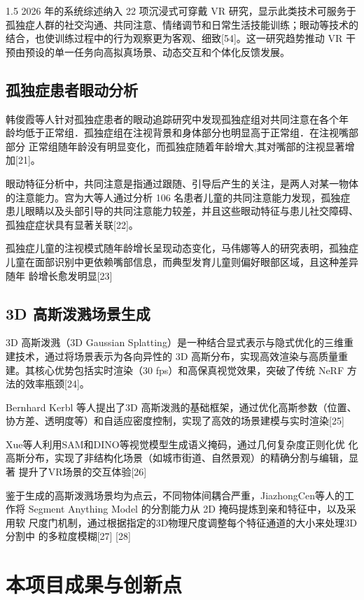 \documentclass[zihao=-4]{ctexart}
\begin{document}
\begin{spacing}{1.5}
2026 年的系统综述纳入 22 项沉浸式可穿戴 VR 研究，显示此类技术可服务于孤独症人群的社交沟通、共同注意、情绪调节和日常生活技能训练；眼动等技术的结合，也使训练过程中的行为观察更为客观、细致[54]。这一研究趋势推动 VR 干预由预设的单一任务向高拟真场景、动态交互和个体化反馈发展。

\subsection{孤独症患者眼动分析}

韩俊霞等人针对孤独症患者的眼动追踪研究中发现孤独症组对共同注意在各个年 龄均低于正常组．孤独症组在注视背景和身体部分也明显高于正常组．在注视嘴部部分 正常组随年龄没有明显变化，而孤独症随着年龄增大,其对嘴部的注视显著增加[21]。

眼动特征分析中，共同注意是指通过跟随、引导后产生的关注，是两人对某一物体的注意能力。宫为大等人通过分析 106 名患者儿童的共同注意能力发现，孤独症患儿眼睛以及头部引导的共同注意能力较差，并且这些眼动特征与患儿社交障碍、孤独症症状具有显著关联[22]。

孤独症儿童的注视模式随年龄增长呈现动态变化，马伟娜等人的研究表明，孤独症 儿童在面部识别中更依赖嘴部信息，而典型发育儿童则偏好眼部区域，且这种差异随年 龄增长愈发明显[23]

\subsection{3D 高斯泼溅场景生成}

3D 高斯泼溅（3D Gaussian Splatting）是一种结合显式表示与隐式优化的三维重建技术，通过将场景表示为各向异性的 3D 高斯分布，实现高效渲染与高质量重建。其核心优势包括实时渲染（30 fps）和高保真视觉效果，突破了传统 NeRF 方法的效率瓶颈[24]。

Bernhard Kerbl 等人提出了3D 高斯泼溅的基础框架，通过优化高斯参数（位置、 协方差、透明度等）和自适应密度控制，实现了高效的场景建模与实时渲染[25]

Xue等人利用SAM和DINO等视觉模型生成语义掩码，通过几何复杂度正则化优 化高斯分布，实现了非结构化场景（如城市街道、自然景观）的精确分割与编辑，显著 提升了VR场景的交互体验[26]

鉴于生成的高斯泼溅场景均为点云，不同物体间耦合严重，JiazhongCen等人的工 作将 Segment Anything Model 的分割能力从 2D 掩码提炼到亲和特征中，以及采用软 尺度门机制，通过根据指定的3D物理尺度调整每个特征通道的大小来处理3D分割中 的多粒度模糊[27] [28]


\section{本项目成果与创新点}


\end{spacing}
\end{document}
